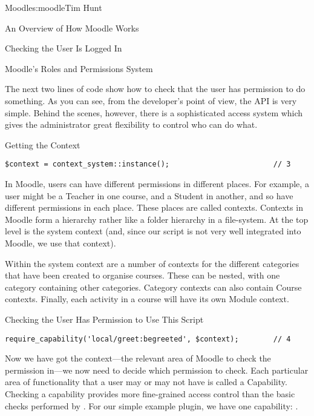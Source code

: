 \begin{aosachapter}{Moodle}{s:moodle}{Tim Hunt}
\begin{aosasect1}{An Overview of How Moodle Works}
\begin{aosasect2}{Checking the User Is Logged In}
\end{aosasect2}

\end{aosasect1}

\begin{aosasect1}{Moodle's Roles and Permissions System}

The next two lines of code show how to check that the user has
permission to do something. As you can see, from the developer's point
of view, the API is very simple. Behind the scenes, however, there is
a sophisticated access system which gives the administrator great
flexibility to control who can do what.

\begin{aosasect2}{Getting the Context}

\begin{verbatim}
$context = context_system::instance();                        // 3
\end{verbatim}

In Moodle, users can have different permissions in different
places. For example, a user might be a Teacher in one course, and a
Student in another, and so have different permissions in each
place. These places are called contexts. Contexts in Moodle form a
hierarchy rather like a folder hierarchy in a file-system. At the top
level is the system context (and, since our script is not very well
integrated into Moodle, we use that context).

Within the system context are a number of contexts for the different
categories that have been created to organise courses. These can be
nested, with one category containing other categories. Category
contexts can also contain Course contexts. Finally, each activity in a
course will have its own Module context.


\end{aosasect2}

\begin{aosasect2}{Checking the User Has Permission to Use This Script}

\begin{verbatim}
require_capability('local/greet:begreeted', $context);        // 4
\end{verbatim}

Now we have got the context---the relevant area of Moodle to check the
permission in---we now need to decide which permission to check. Each
particular area of functionality that a user may or may not have is
called a Capability. Checking a capability provides more fine-grained
access control than the basic checks performed by
. For our simple example plugin, we have one
capability: .


\end{aosasect2}
\end{aosasect1}
\end{aosachapter}
